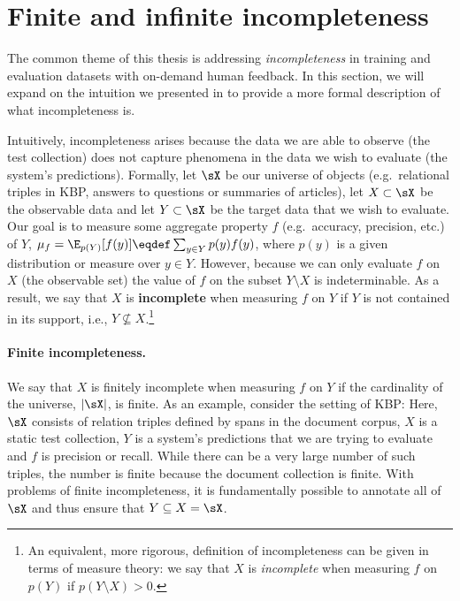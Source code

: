 \section{\label{sec:setup:incompleteness} Finite and infinite incompleteness}

The common theme of this thesis is addressing \textit{incompleteness} in training and evaluation datasets with on-demand human feedback. 
In this section, we will expand on the intuition we presented in  to provide a more formal description of what incompleteness is.

Intuitively, incompleteness arises because the data we are able to observe (the test collection)  does not capture phenomena in the data we wish to evaluate (the system's predictions).
Formally,
  let $\sX$ be our universe of objects (e.g.\ relational triples in KBP, answers to questions or summaries of articles),
  let $X \subset \sX$ be the observable data
  and let $Y \subset \sX$ be the target data that we wish to evaluate.
Our goal is to measure some aggregate property $f$ (e.g.\
accuracy, precision, etc.) of $Y$, $\mu_f = \E_{p(Y)}[f(y)] \eqdef \sum_{y \in Y} p(y) f(y)$, where $p(y)$ is a given distribution or measure over $y \in Y$.
However, because we can only evaluate $f$ on $X$ (the observable set) the value of $f$ on the subset $Y \setminus X$ is indeterminable.
As a result, we say that $X$ is \textbf{incomplete} when measuring $f$ on $Y$ if $Y$ is not contained in its support, i.e., $Y \not\subseteq X$.\footnote{%
An equivalent, more rigorous, definition of incompleteness can be given in terms of measure theory: we say that $X$ is \textit{incomplete} when measuring $f$ on $p(Y)$ if $p(Y \setminus X) > 0$.
}

\paragraph{Finite incompleteness.}
We say that $X$ is finitely incomplete when measuring $f$ on $Y$ if the cardinality of the universe, $|\sX|$, is finite.
As an example, consider the setting of KBP:\@
Here, $\sX$ consists of relation triples defined by spans in the document corpus, $X$ is a static test collection, $Y$ is a system's predictions that we are trying to evaluate and $f$ is precision or recall.
While there can be a very large number of such triples, the number is finite because the document collection is finite.
With problems of finite incompleteness, it is fundamentally possible to annotate all of $\sX$ and thus ensure that $Y \subseteq X = \sX$.

